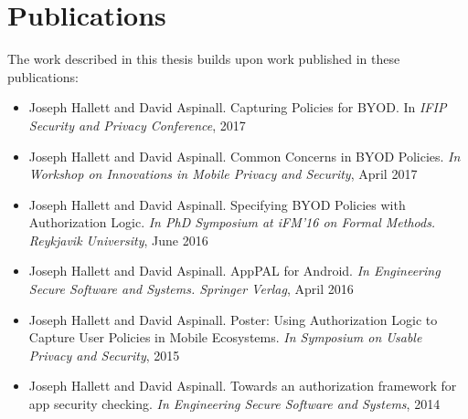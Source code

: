 \documentclass[thesis.tex]{subfiles}
\begin{document}
\section{Publications}

The work described in this thesis builds upon work published in these publications:

\begin{itemize}
\item 
Joseph Hallett and David Aspinall. Capturing Policies for BYOD. In \emph{IFIP Security and Privacy Conference}, 2017
\item Joseph Hallett and David Aspinall. Common Concerns in BYOD Policies. \emph{In Workshop on Innovations in Mobile Privacy and Security}, April 2017
\item Joseph Hallett and David Aspinall. Specifying BYOD Policies with Authorization Logic. \emph{In PhD Symposium at iFM'16 on Formal Methods. Reykjavik University}, June 2016
\item Joseph Hallett and David Aspinall. AppPAL for Android. \emph{In Engineering Secure Software and Systems. Springer Verlag}, April 2016
\item Joseph Hallett and David Aspinall. Poster: Using Authorization Logic to Capture User Policies in Mobile Ecosystems. \emph{In Symposium on Usable Privacy and Security}, 2015
\item Joseph Hallett and David Aspinall. Towards an authorization framework for app security checking. \emph{In Engineering Secure Software and Systems}, 2014
\end{itemize}
\end{document}
